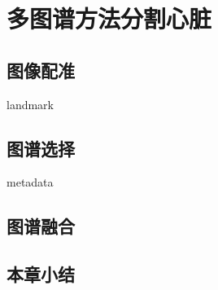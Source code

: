 
\chapter{多图谱方法分割心脏}

\section{图像配准}
landmark\par

\section{图谱选择}
metadata\par

\section{图谱融合}

\section{本章小结}

